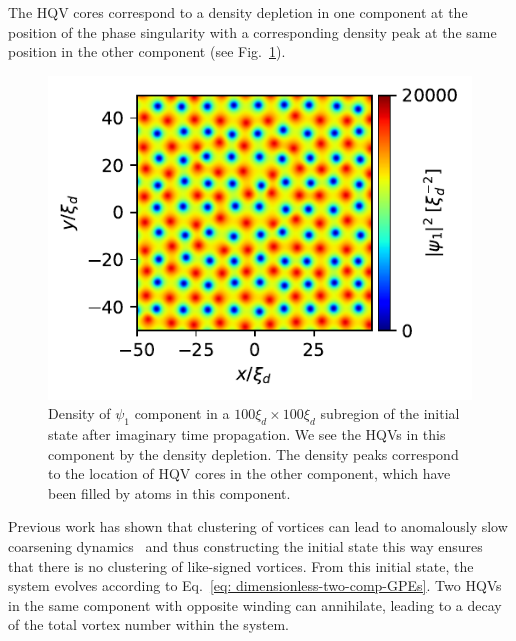 The HQV cores correspond to a density depletion in one component at the position
of the phase singularity with a corresponding density peak at the same position
in the other component (see Fig.~\ref{fig:initial-vortex-state}).
\begin{figure}
    \centering
    \includegraphics{gfx/ch-twoCompDynamics/init_state.pdf}
    \caption[Initial state containing half-quantum vortices]
    {Density of \(\psi_1 \) component in a \(100\xi_d\times100\xi_d\)
        subregion of the initial state after imaginary time propagation.
        We see the HQVs in this component by the density depletion.
        The density peaks correspond to the location of HQV cores in the other
        component, which have been filled by atoms in this
        component.\label{fig:initial-vortex-state}}
\end{figure}
Previous work has shown that clustering of vortices can lead to anomalously
slow coarsening dynamics~\cite{Karl2017} and thus constructing the initial
state this way ensures that there is no clustering of like-signed vortices.
From this initial state, the system evolves according to
Eq.~\eqref{eq: dimensionless-two-comp-GPEs}.
Two HQVs in the same component with opposite winding can annihilate, leading to
a decay of the total vortex number within the system.


